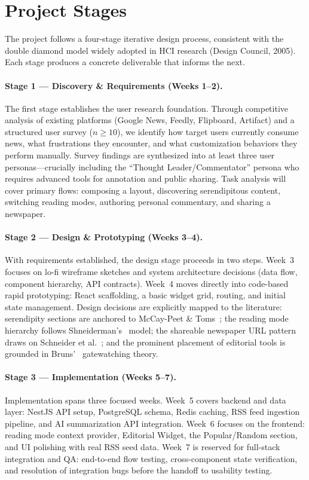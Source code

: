 \documentclass[14pt]{article}
\begin{document}
\section{Project Stages}

The project follows a four-stage iterative design process, consistent with the double diamond model widely adopted in HCI research (Design Council, 2005). Each stage produces a concrete deliverable that informs the next.

\paragraph{Stage 1 --- Discovery \& Requirements (Weeks 1--2).}
The first stage establishes the user research foundation. Through competitive analysis of existing platforms (Google News, Feedly, Flipboard, Artifact) and a structured user survey ($n \geq 10$), we identify how target users currently consume news, what frustrations they encounter, and what customization behaviors they perform manually. Survey findings are synthesized into at least three user personas---crucially including the ``Thought Leader/Commentator'' persona who requires advanced tools for annotation and public sharing. Task analysis will cover primary flows: composing a layout, discovering serendipitous content, switching reading modes, authoring personal commentary, and sharing a newspaper.

\paragraph{Stage 2 --- Design \& Prototyping (Weeks 3--4).}
With requirements established, the design stage proceeds in two steps. Week~3 focuses on lo-fi wireframe sketches and system architecture decisions (data flow, component hierarchy, API contracts). Week~4 moves directly into code-based rapid prototyping: React scaffolding, a basic widget grid, routing, and initial state management. Design decisions are explicitly mapped to the literature: serendipity sections are anchored to McCay-Peet \& Toms~\cite{mccaypeet2015}; the reading mode hierarchy follows Shneiderman's~\cite{shneiderman1996} model; the shareable newspaper URL pattern draws on Schneider et al.~\cite{schneider2017}; and the prominent placement of editorial tools is grounded in Bruns'~\cite{bruns2005} gatewatching theory.

\paragraph{Stage 3 --- Implementation (Weeks 5--7).}
Implementation spans three focused weeks. Week~5 covers backend and data layer: NestJS API setup, PostgreSQL schema, Redis caching, RSS feed ingestion pipeline, and AI summarization API integration. Week~6 focuses on the frontend: reading mode context provider, Editorial Widget, the Popular/Random section, and UI polishing with real RSS seed data. Week~7 is reserved for full-stack integration and QA: end-to-end flow testing, cross-component state verification, and resolution of integration bugs before the handoff to usability testing.
\end{document}
